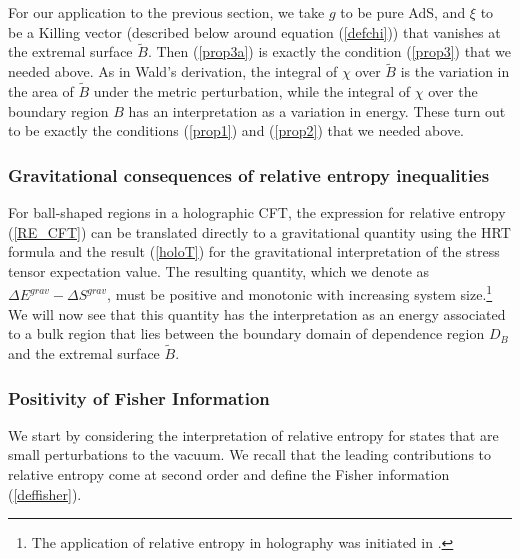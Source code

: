 \documentclass[12pt,epsf]{article}
\begin{document}
For our application to the previous section, we take $g$ to be pure AdS, and $\xi$ to be a Killing vector (described below around equation (\ref{defchi})) that vanishes at the extremal surface $\tilde{B}$. Then (\ref{prop3a}) is exactly the condition (\ref{prop3}) that we needed above. As in Wald's derivation, the integral of $\chi$ over $\tilde{B}$ is the variation in the area of $\tilde{B}$ under the metric perturbation, while the integral of $\chi$ over the boundary region $B$ has an interpretation as a variation in energy. These turn out to be exactly the conditions (\ref{prop1}) and (\ref{prop2}) that we needed above.

\subsubsection{Gravitational consequences of relative entropy inequalities}

For ball-shaped regions in a holographic CFT, the expression for relative entropy (\ref{RE_CFT}) can be translated directly to a gravitational quantity using the HRT formula and the result (\ref{holoT}) for the gravitational interpretation of the stress tensor expectation value. The resulting quantity, which we denote as $\Delta E^{grav} - \Delta S^{grav}$, must be positive and monotonic with increasing system size.\footnote{The application of relative entropy in holography was initiated in \cite{blanco2013relative}.} We will now see that this quantity has the interpretation as an energy associated to a bulk region that lies between the boundary domain of dependence region $D_B$ and the extremal surface $\tilde{B}$.

\subsubsection*{Positivity of Fisher Information}

We start by considering the interpretation of relative entropy for states that are small perturbations to the vacuum. We recall that the leading contributions to relative entropy come at second order and define the Fisher information (\ref{deffisher}).
\end{document}
